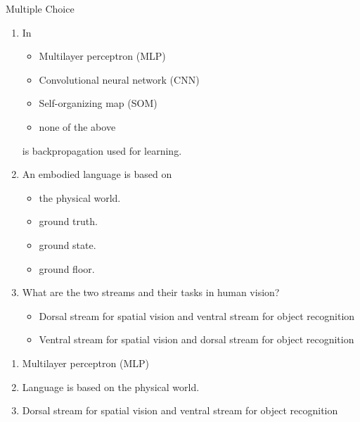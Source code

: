 \documentclass{article}
\begin{document}
\begin{exercise}{Multiple Choice}
  \begin{enumerate}
    \item In 
      \begin{itemize}
        \item Multilayer perceptron (MLP)
        \item Convolutional neural network (CNN)
        \item Self-organizing map (SOM)
        \item none of the above
      \end{itemize}
        is backpropagation used for learning.

    \item An embodied language is based on
      \begin{itemize}
        \item the physical world.
        \item ground truth.
        \item ground state.
        \item ground floor.
      \end{itemize}

    \item What are the two streams and their tasks in human vision?
      \begin{itemize}
        \item Dorsal stream for spatial vision and ventral stream for object recognition
        \item Ventral stream for spatial vision and dorsal stream for object recognition
      \end{itemize}
  \end{enumerate}

  \begin{solution}
    \begin{enumerate}
      \item Multilayer perceptron (MLP)
      \item Language is based on the physical world.
      \item Dorsal stream for spatial vision and ventral stream for object recognition
    \end{enumerate}
  \end{solution}
\end{exercise}
\end{document}
